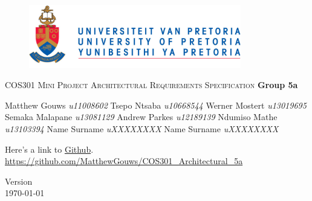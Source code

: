 \begin{titlepage}
\begin{center}
	\begin{figure}[t]
		\centering
		\includegraphics[width=350px]{UP_Logo.png}
	\end{figure}
	
\textsc{\LARGE COS301 Mini Project \newline\newline Architectural Requirements Specification}
		\textbf{\newline Group 5a} \\
		\begin{flushright} \large
			Matthew Gouws \emph{u11008602} \newline
			Tsepo Ntsaba \emph{u10668544} \newline
			Werner Mostert \emph{u13019695} \newline
			Semaka Malapane \emph{u13081129} \newline
			Andrew Parkes \emph{u12189139} \newline
			Ndumiso Mathe \emph{u13103394} \newline
			Name Surname \emph{uXXXXXXXX} \newline
			Name Surname \emph{uXXXXXXXX} \newline
		\end{flushright}
		
		\vfill
		
Here's a link to \href{https://github.com/MatthewGouws/COS301_Architectural_5a}{Github}.\\
	\url{https://github.com/MatthewGouws/COS301_Architectural_5a}		
		
		{\large Version }
		\\
		{\large \today}
		
\end{center}
\end{titlepage}
